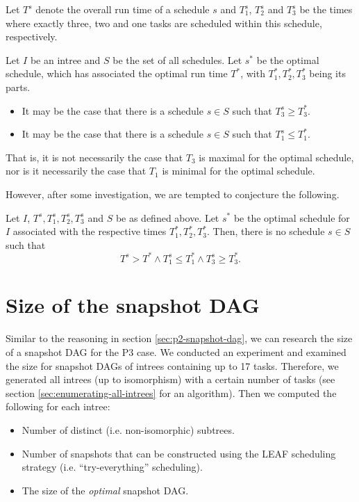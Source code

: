 \begin{corollary}
  Let $T^s$ denote the overall run time of a schedule $s$ and $T_1^s$, $T_2^s$ and $T_3^s$ be the times where exactly three, two and one tasks are scheduled within this schedule, respectively.

  Let $I$ be an intree and $S$ be the set of all schedules. Let $s^*$ be the optimal schedule, which has associated the optimal run time $T^*$, with $T_1^*, T_2^*, T_3^*$ being its parts.
  \begin{itemize}
  \item It may be the case that there is a schedule $s\in S$ such that $T_3^s \geq T_3^*$.
  \item It may be the case that there is a schedule $s\in S$ such that $T_1^s \leq T_1^*$.
  \end{itemize}
\end{corollary}

That is, it is not necessarily the case that $T_3$ is maximal for the optimal schedule, nor is it necessarily the case that $T_1$ is minimal for the optimal schedule.

However, after some investigation, we are tempted to conjecture the following.

\begin{conjecture}
  Let $I$, $T^s, T_1^s, T_2^s, T_3^s$ and $S$ be as defined above. Let $s^*$ be the optimal schedule for $I$ associated with the respective times $T_1^*, T_2^*, T_3^*$. Then, there is no schedule $s\in S$ such that
  \begin{equation*}
    T^s > T^* \wedge T_1^s \leq T_1^* \wedge T_3^s \geq T_3^*.
  \end{equation*}
\end{conjecture}

\clearpage{}

\section{Size of the snapshot DAG}
\label{sec:p3-size-of-snapshot-dag-first-attempts}

Similar to the reasoning in section \ref{sec:p2-snapshot-dag}, we can research the size of a snapshot DAG for the P3 case. 
We conducted an experiment and examined the size for snapshot DAGs of intrees containing up to 17 tasks. 
Therefore, we generated all intrees (up to isomorphism) with a certain number of tasks (see section \ref{sec:enumerating-all-intrees} for an algorithm).
Then we computed the following for each intree:
\begin{itemize}
\item Number of distinct (i.e. non-isomorphic) subtrees.
\item Number of snapshots that can be constructed using the LEAF scheduling strategy (i.e. ``try-everything'' scheduling).
\item The size of the \emph{optimal} snapshot DAG.
\end{itemize}

